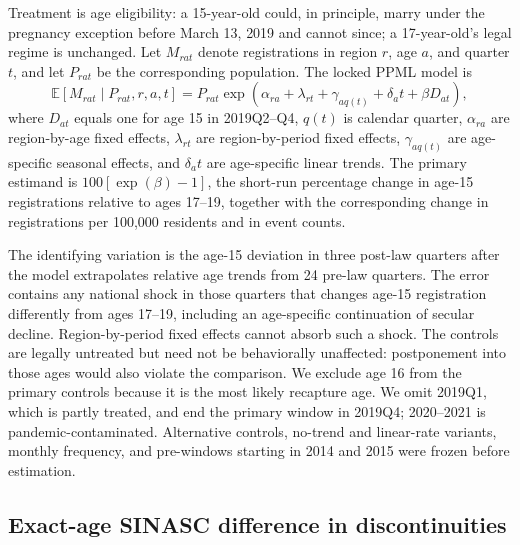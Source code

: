 \documentclass[12pt]{article}
\begin{document}
Treatment is age eligibility: a 15-year-old could, in principle, marry under the
pregnancy exception before March 13, 2019 and cannot since; a 17-year-old's legal regime
is unchanged. Let $M_{rat}$ denote registrations in region $r$, age $a$, and quarter
$t$, and let $P_{rat}$ be the corresponding population. The locked PPML model is
\begin{equation}
 \mathbb{E}[M_{rat}\mid P_{rat},r,a,t]
 =P_{rat}\exp\!\left(\alpha_{ra}+\lambda_{rt}+\gamma_{aq(t)}
 +\delta_a t+\beta D_{at}\right),
 \label{eq:registry}
\end{equation}
where $D_{at}$ equals one for age 15 in 2019Q2--Q4, $q(t)$ is calendar quarter,
$\alpha_{ra}$ are region-by-age fixed effects, $\lambda_{rt}$ are region-by-period fixed
effects, $\gamma_{aq(t)}$ are age-specific seasonal effects, and $\delta_a t$ are
age-specific linear trends. The primary estimand is $100[\exp(\beta)-1]$, the short-run
percentage change in age-15 registrations relative to ages 17--19, together with the
corresponding change in registrations per 100,000 residents and in event counts.

The identifying variation is the age-15 deviation in three post-law quarters after the
model extrapolates relative age trends from 24 pre-law quarters. The error contains any
national shock in those quarters that changes age-15 registration differently from ages
17--19, including an age-specific continuation of secular decline. Region-by-period
fixed effects cannot absorb such a shock. The controls are legally untreated but need
not be behaviorally unaffected: postponement into those ages would also violate the
comparison. We exclude age 16 from the primary controls because it is the most likely
recapture age. We omit 2019Q1, which is partly treated, and end the primary window in
2019Q4; 2020--2021 is pandemic-contaminated. Alternative controls, no-trend and
linear-rate variants, monthly frequency, and pre-windows starting in 2014 and 2015 were
frozen before estimation.

\subsection{Exact-age SINASC difference in discontinuities}
\end{document}
